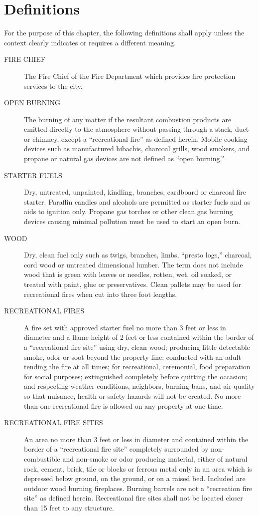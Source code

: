 \section{Definitions}
For the purpose of this chapter, the following definitions shall apply unless the context clearly indicates or requires a different meaning.
\begin{description}
    \item[FIRE CHIEF] The Fire Chief of the Fire Department which provides fire protection services to the city.
    \item[OPEN BURNING] The burning of any matter if the resultant combustion products are emitted directly to the atmosphere without passing through a stack, duct or chimney, except a “recreational fire” as defined herein. Mobile cooking devices such as manufactured hibachis, charcoal grills, wood smokers, and propane or natural gas devices are not defined as “open burning.”  
    \item[STARTER FUELS] Dry, untreated, unpainted, kindling, branches, cardboard or charcoal fire starter. Paraffin candles and alcohols are permitted as starter fuels and as aids to ignition only.  Propane gas torches or other clean gas burning devices causing minimal pollution must be used to start an open burn.
    \item[WOOD] Dry, clean fuel only such as twigs, branches, limbs, “presto logs,” charcoal, cord wood or untreated dimensional lumber. The term does not include wood that is green with leaves or needles, rotten, wet, oil soaked, or treated with paint, glue or preservatives. Clean pallets may be used for recreational fires when cut into three foot lengths.
    \item[RECREATIONAL FIRES] A fire set with approved starter fuel no more than 3 feet or less in diameter and a flame height of 2 feet or less contained within the border of a “recreational fire site” using dry, clean wood; producing little detectable smoke, odor or soot beyond the property line; conducted with an adult tending the fire at all times; for recreational, ceremonial, food preparation for social purposes; extinguished completely before quitting the occasion; and respecting weather conditions, neighbors, burning bans, and air quality so that nuisance, health or safety hazards will not be created. No more than one recreational fire is allowed on any property at one time.
    \item[RECREATIONAL FIRE SITES] An area no more than 3 feet or less in diameter and contained within the border of a “recreational fire site” completely surrounded by non-combustible and non-smoke or odor producing material, either of natural rock, cement, brick, tile or blocks or ferrous metal only in an area which is depressed below ground, on the ground, or on a raised bed. Included are outdoor wood burning fireplaces. Burning barrels are not a “recreation fire site” as defined herein. Recreational fire sites shall not be located closer than 15 feet to any structure.
\end{description}
